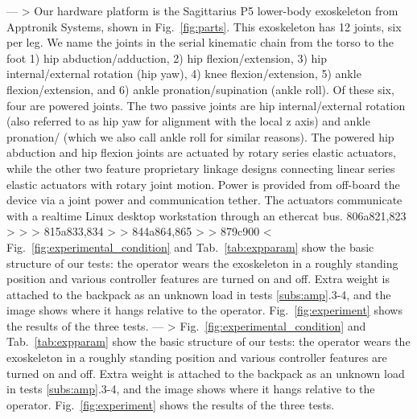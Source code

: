 ---
> Our hardware platform is the Sagittarius P5 lower-body exoskeleton from Apptronik Systems, shown in Fig.~\ref{fig:parts}. This exoskeleton has 12 joints, six per leg. We name the joints in the serial kinematic chain from the torso to the foot 1) hip abduction/adduction, 2) hip flexion/extension, 3) hip internal/external rotation (hip yaw), 4) knee flexion/extension, 5) ankle flexion/extension, and 6) ankle pronation/supination (ankle roll). Of these six, four are powered joints. The two passive joints are hip internal/external rotation (also referred to as hip yaw for alignment with the local z axis) and ankle pronation/ (which we also call ankle roll for similar reasons). The powered hip abduction and hip flexion joints are actuated by rotary series elastic actuators, while the other two feature proprietary linkage designs connecting linear series elastic actuators with rotary joint motion. Power is provided from off-board the device via a joint power and communication tether. The actuators communicate with a realtime Linux desktop workstation through an ethercat bus.
806a821,823
> %
> 
> 
815a833,834
> 
> 
844a864,865
> 
> 
879c900
< Fig.~\ref{fig:experimental_condition} and Tab.~\ref{tab:expparam} show the basic structure of our tests: the operator wears the exoskeleton in a roughly standing position and various controller features are turned on and off. Extra weight is attached to the backpack as an unknown load in tests \ref{subs:amp}.3-4, and the image shows where it hangs relative to the operator. Fig.~\ref{fig:experiment} shows the results of the three tests. 
---
> Fig.~\ref{fig:experimental_condition} and Tab.~\ref{tab:expparam} show the basic structure of our tests: the operator wears the exoskeleton in a roughly standing position and various controller features are turned on and off. Extra weight is attached to the backpack as an unknown load in tests \ref{subs:amp}.3-4, and the image shows where it hangs relative to the operator. Fig.~\ref{fig:experiment} shows the results of the three tests. 
